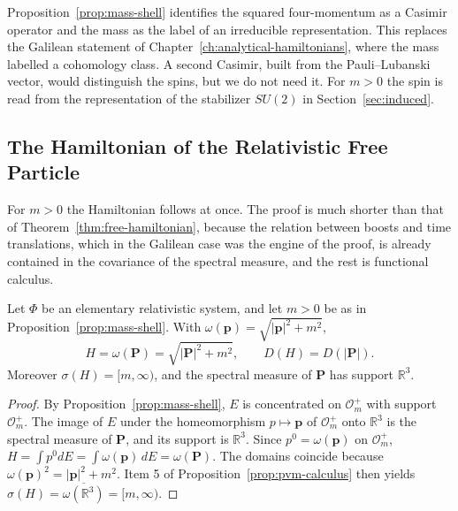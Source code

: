 	\begin{remark}\label{rem:casimir-label}
		Proposition~\ref{prop:mass-shell} identifies the squared four-momentum as a Casimir operator and the mass as the label of an irreducible representation. This replaces the Galilean statement of Chapter~\ref{ch:analytical-hamiltonians}, where the mass labelled a cohomology class. A second Casimir, built from the Pauli--Lubanski vector, would distinguish the spins, but we do not need it. For $m>0$ the spin is read from the representation of the stabilizer $SU(2)$ in Section~\ref{sec:induced}.
	\end{remark}
	
	\subsection{The Hamiltonian of the Relativistic Free Particle}\label{sec:poincare-hamiltonian}
	
	For $m>0$ the Hamiltonian follows at once. The proof is much shorter than that of Theorem~\ref{thm:free-hamiltonian}, because the relation between boosts and time translations, which in the Galilean case was the engine of the proof, is already contained in the covariance of the spectral measure, and the rest is functional calculus.
	
	\begin{theorem}\label{thm:relativistic-hamiltonian}
		Let $\Phi$ be an elementary relativistic system, and let $m>0$ be as in Proposition~\ref{prop:mass-shell}. With $\omega(\mathbf{p})=\sqrt{|\mathbf{p}|^2+m^2}$,
		\begin{equation}\label{eq:relativistic-hamiltonian}
			H=\omega(\mathbf{P})=\sqrt{|\mathbf{P}|^2+m^2}, \qquad D(H)=D(|\mathbf{P}|).
		\end{equation}
		Moreover $\sigma(H)=[m,\infty)$, and the spectral measure of $\mathbf{P}$ has support $\mathbb{R}^3$.
	\end{theorem}
	
	\begin{proof}
		By Proposition~\ref{prop:mass-shell}, $E$ is concentrated on $\mathcal{O}_m^+$ with support $\mathcal{O}_m^+$. The image of $E$ under the homeomorphism $p\mapsto\mathbf{p}$ of $\mathcal{O}_m^+$ onto $\mathbb{R}^3$ is the spectral measure of $\mathbf{P}$, and its support is $\mathbb{R}^3$. Since $p^0=\omega(\mathbf{p})$ on $\mathcal{O}_m^+$, $H=\int p^0dE=\int\omega(\mathbf{p})\,dE=\omega(\mathbf{P})$. The domains coincide because $\omega(\mathbf{p})^2=|\mathbf{p}|^2+m^2$. Item 5 of Proposition~\ref{prop:pvm-calculus} then yields $\sigma(H)=\overline{\omega(\mathbb{R}^3)}=[m,\infty)$.
	\end{proof}
	
